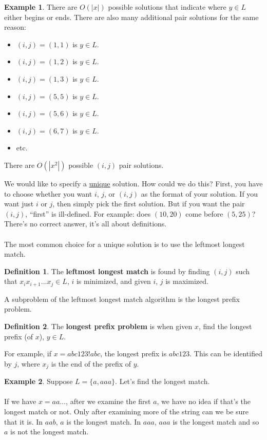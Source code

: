 \documentclass[]{article}
\theoremstyle{definition}
\newtheorem*{defn}{Definition}
\newtheorem{ex}{Example}[section]
\begin{document}
\begin{ex}
				There are $O(|x|)$ possible solutions that indicate where $y \in L$ either begins or ends. There are also many additional pair solutions for the same reason:
				\begin{itemize}
					\item $(i, j) = (1, 1)$ is $y \in L$.
					\item $(i, j) = (1, 2)$ is $y \in L$.
					\item $(i, j) = (1, 3)$ is $y \in L$.
					\item $(i, j) = (5, 5)$ is $y \in L$.
					\item $(i, j) = (5, 6)$ is $y \in L$.
					\item $(i, j) = (6, 7)$ is $y \in L$.
					\item etc.
				\end{itemize}

				There are $O(|x^2|)$ possible $(i, j)$ pair solutions.
			\end{ex}
			We would like to specify a \underline{unique} solution. How could we do this? First, you have to choose whether you want $i$, $j$, or $(i, j)$ as the format of your solution. If you want just $i$ or $j$, then simply pick the first solution. But if you want the pair $(i, j)$, ``first'' is ill-defined. For example: does $(10, 20)$ come before $(5, 25)$? There's no correct answer, it's all about definitions.
			\\ \\
			The most common choice for a unique solution is to use the leftmost longest match.
			\begin{defn}
				The \textbf{leftmost longest match} is found by finding $(i, j)$ such that $x_i x_{i + 1} \ldots x_j \in L$, $i$ is minimized, and given $i$, $j$ is maximized.
			\end{defn}
			A subproblem of the leftmost longest match algorithm is the longest prefix problem.
			\begin{defn}
				The \textbf{longest prefix problem} is when given $x$, find the longest prefix (of $x$), $y \in L$.
			\end{defn}

			For example, if $x = abc123!abc$, the longest prefix is $abc123$. This can be identified by $j$, where $x_j$ is the end of the prefix of $y$.
			\begin{ex}
				Suppose $L = \{a, aaa\}$. Let's find the longest match.
				\\ \\
				If we have $x = aa\ldots$, after we examine the first $a$, we have no idea if that's the longest match or not. Only after examining more of the string can we be sure that it is. In $aab$, $a$ is the longest match. In $aaa$, $aaa$ is the longest match and so $a$ is not the longest match.
			\end{ex}
\end{document}
